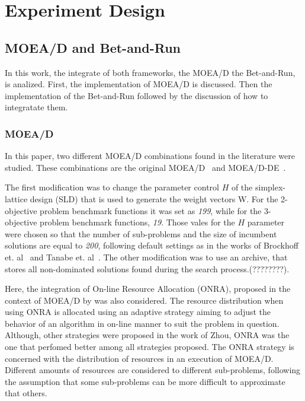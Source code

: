 \section{Experiment Design}

\subsection{MOEA/D and Bet-and-Run}

In this work, the integrate of both frameworks, the MOEA/D the Bet-and-Run, is analized. First, the implementation of MOEA/D is discussed. Then the implementation of the Bet-and-Run followed by the discussion of how to integratate them.

\subsubsection{MOEA/D}

In this paper, two different MOEA/D combinations found in the literature  were studied. These combinations are the original MOEA/D~\cite{zhang2007moea} and MOEA/D-DE~\cite{li2009multiobjective}. 

The first modification was to change the parameter control $H$ of the simplex-lattice design (SLD) that is used to generate the weight vectors W. For the 2-objective problem benchmark functions it was set as \textit{199}, while for the 3-objective problem benchmark functions, \textit{19}. Those vales for the $H$ parameter were chosen so that the number of sub-problems and the size of incumbent solutions are equal to \textit{200}, following default settings as in the works of Brockhoff et. al~\cite{brockhoff2015benchmarking} and Tanabe et. al~\cite{tanabe2018analysis}. The other modification was to use an archive, that stores all non-dominated solutions found during the search process.(????????). 

Here, the integration of On-line Resource Allocation (ONRA), proposed in the context of MOEA/D by \cite{zhou2016all} was also considered. The resource distribution when using ONRA is allocated using an adaptive strategy aiming to adjust the behavior of an algorithm in on-line manner to suit the problem in question. Although, other strategies were proposed in the work of Zhou, ONRA was the one that perfomed better among all strategies proposed. The ONRA strategy is concerned with the distribution of resources in an execution of MOEA/D. Different amounts of resources are considered to different sub-problems, following the assumption that some sub-problems can be more difficult to approximate that others. 

